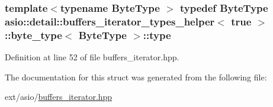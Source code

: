 \subsubsection[{type}]{\setlength{\rightskip}{0pt plus 5cm}template$<$typename Byte\+Type $>$ typedef Byte\+Type {\bf asio\+::detail\+::buffers\+\_\+iterator\+\_\+types\+\_\+helper}$<$ true $>$\+::byte\+\_\+type$<$ Byte\+Type $>$\+::{\bf type}}\label{structasio_1_1detail_1_1buffers__iterator__types__helper_3_01true_01_4_1_1byte__type_ae33e5b0cb09ca144f1a2262a7a31502a}


Definition at line 52 of file buffers\+\_\+iterator.\+hpp.



The documentation for this struct was generated from the following file\+:\begin{DoxyCompactItemize}
\item 
ext/asio/\hyperlink{buffers__iterator_8hpp}{buffers\+\_\+iterator.\+hpp}\end{DoxyCompactItemize}
